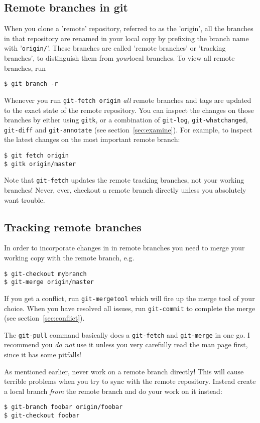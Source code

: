 \documentclass[a4paper,10pt]{article}
\begin{document}
\subsection{Remote branches in git}
\label{sec:branch}
When you clone a 'remote' repository, referred to as the 'origin', all the
branches in that repository are renamed in your local copy by prefixing the
branch name with '\texttt{origin/}'. These branches are called 'remote
branches' or 'tracking branches', to distinguish them from \emph{your}local
branches.  To view all remote branches, run
\begin{verbatim}
$ git branch -r
\end{verbatim}

Whenever you run
\texttt{git-fetch origin} \emph{all} remote branches and tags 
are updated to the exact
state of the remote repository. You can inspect the changes on those
branches by either using \texttt{gitk}, or a combination of \texttt{git-log},
\texttt{git-whatchanged}, \texttt{git-diff} and \texttt{git-annotate} (see
section~\ref{sec:examine}).
For example, to inspect the latest changes on the most important remote branch:
\begin{verbatim}
$ git fetch origin
$ gitk origin/master
\end{verbatim}
Note that \texttt{git-fetch} updates the remote
tracking branches, not your working branches!  Never, ever, checkout a remote
branch directly unless you absolutely want trouble. 

\subsection{Tracking remote branches}
In order to incorporate changes in in remote branches you need to merge your
working copy with the remote branch, e.g. 
\begin{verbatim}
$ git-checkout mybranch
$ git-merge origin/master 
\end{verbatim}
If you get a conflict, run
\texttt{git-mergetool} which will fire up the merge tool of your choice. When
you have resolved all issues, run \texttt{git-commit} to complete the merge 
(see section~\ref{sec:conflict}).

The \texttt{git-pull} command basically does a \texttt{git-fetch} and
\texttt{git-merge} in one go. I recommend you \emph{do not} use it unless you
very carefully read the man page first, since it has some pitfalls!

As mentioned earlier, never work on a remote branch directly! This will
cause terrible problems when you try to sync with the remote repository.
Instead create a local branch \emph{from} the remote branch and do your work
on it instead: 
\begin{verbatim}
$ git-branch foobar origin/foobar
$ git-checkout foobar 
\end{verbatim}
\end{document}
